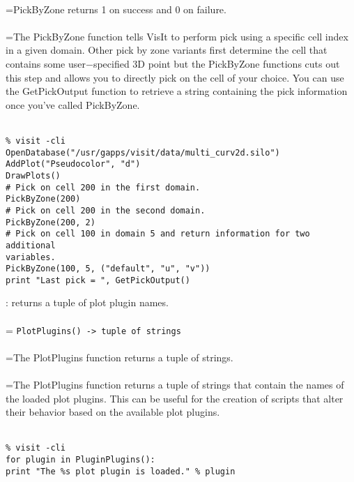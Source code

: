 \documentclass[10pt,a4paper]{report}
\begin{document}
 \\ 
\hangindent=\parindent PickByZone returns 1 on success and 0 on failure. \\[-3mm] 

 \\ 
\hangindent=\parindent The PickByZone function tells VisIt to perform pick using a specific cell index in a given domain. Other pick by zone variants first determine the cell that contains some user$-$specified 3D point but the PickByZone functions cuts out this step and allows you to directly pick on the cell of your choice. You can use the GetPickOutput function to retrieve a string containing the pick information once you've called PickByZone. \\[-3mm] 

\\[-6mm]
\begin{verbatim}% visit -cli
OpenDatabase("/usr/gapps/visit/data/multi_curv2d.silo")
AddPlot("Pseudocolor", "d")
DrawPlots()
# Pick on cell 200 in the first domain.
PickByZone(200)
# Pick on cell 200 in the second domain.
PickByZone(200, 2)
# Pick on cell 100 in domain 5 and return information for two additional
variables.
PickByZone(100, 5, ("default", "u", "v"))
print "Last pick = ", GetPickOutput()
\end{verbatim}
\newpage


{}
: returns a tuple of plot plugin names.\\[-3mm]

 \\ 
\hangindent=\parindent 
\verb!PlotPlugins() -> tuple of strings!\\ [-3mm]

 \\ 
\hangindent=\parindent The PlotPlugins function returns a tuple of strings. \\[-3mm] 

 \\ 
\hangindent=\parindent The PlotPlugins function returns a tuple of strings that contain the names of the loaded plot plugins. This can be useful for the creation of scripts that alter their behavior based on the available plot plugins. \\[-3mm] 

\\[-6mm]
\begin{verbatim}% visit -cli
for plugin in PluginPlugins():
print "The %s plot plugin is loaded." % plugin
\end{verbatim}
\newpage
\end{document}
